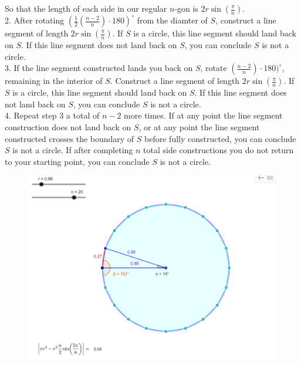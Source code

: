 \documentclass[11pt]{article}
\begin{document}
So that the length of each side in our regular \(n\)-gon is \(2r\sin\left( \frac{\pi}{n} \right)\).
\\[1\baselineskip]
2. After rotating \((\frac{1}{2}(\frac{n-2}{n})\cdot 180)^{\circ}\) from the diamter of \(S\), construct a line segment of length \(2r\sin\left( \frac{\pi}{n} \right)\).  If \(S\) is a circle, this line segment should land back on \(S\).  If this line segment does not land back on \(S\), you can conclude \(S\) is not a circle.
\\[1\baselineskip]
3. If the line segment constructed lands you back on \(S\), rotate \((\frac{n-2}{n})\cdot 180)^{\circ}\), remaining in the interior of \(S\).  Construct a line segment of length \(2r\sin\left( \frac{\pi}{n} \right)\).  If \(S\) is a circle, this line segment should land back on \(S\).  If this line segment does not land back on \(S\), you can conclude \(S\) is not a circle. 
\\[1\baselineskip]
4. Repeat step 3 a total of \(n-2\) more times.  If at any point the line segment construction does not land back on \(S\), or at any point the line segment constructed crosses the boundary of \(S\) before fully constructed, you can conclude \(S\) is not a circle.  If after completing \(n\) total side constructions you do not return to your starting point, you can conclude \(S\) is not a circle.
\begin{center}
	\begin{figure}[h]
		\includegraphics[scale=0.29]{circle_7.jpg}
	\end{figure}
\end{center}
\end{document}
